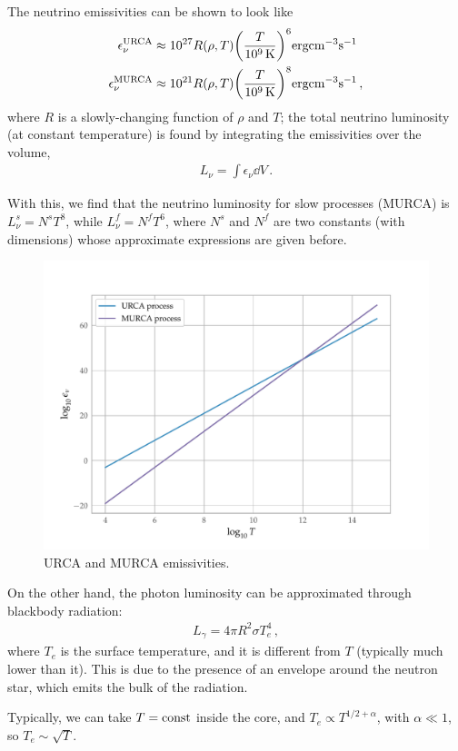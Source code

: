 \documentclass[main.tex]{subfiles}
\begin{document}
The neutrino emissivities can be shown to look like
%
\begin{align}
\epsilon _\nu^{\text{URCA}} &\approx \num{e27} R(\rho, T) \qty(\frac{T}{\SI{e9}{K}})^{6} \SI{}{erg cm^{-3} s^{-1}} \\
\epsilon _\nu^{\text{MURCA}} &\approx \num{e21} R(\rho, T) \qty(\frac{T}{\SI{e9}{K}})^{8} \SI{}{erg cm^{-3} s^{-1}}
\,,
\end{align}
%
where \(R\) is a slowly-changing function of \(\rho \) and \(T\); the total neutrino luminosity (at constant temperature) is found by integrating the emissivities over the volume,
%
\begin{align}
L_\nu = \int \epsilon _\nu \dd{V}
\,.
\end{align}

With this, we find that the neutrino luminosity for slow processes (MURCA) is \(L_\nu^{s} = N^{s} T^{8}\), while \(L_\nu^{f} = N^{f} T^{6}\), where \(N^{s}\) and \(N^{f}\) are two constants (with dimensions) whose approximate expressions are given before. 

\begin{figure}[H]
\centering
\includegraphics[width=.7\textwidth]{figures/urca-murca}
\caption{URCA and MURCA emissivities.}
\label{fig:urca-murca}
\end{figure}

On the other hand, the photon luminosity can be approximated through blackbody radiation: 
%
\begin{align}
L_\gamma = 4 \pi R^2 \sigma T_e^4
\,,
\end{align}
%
where \(T_e\) is the surface temperature, and it is different from \(T\) (typically much lower than it). 
This is due to the presence of an envelope around the neutron star, which emits the bulk of the radiation. 

Typically, we can take \(T = \text{const}\) inside the core, and \(T_e \propto T^{1/2 + \alpha }\), with \(\alpha \ll 1\), so \(T_e \sim \sqrt{T}\).
\end{document}
